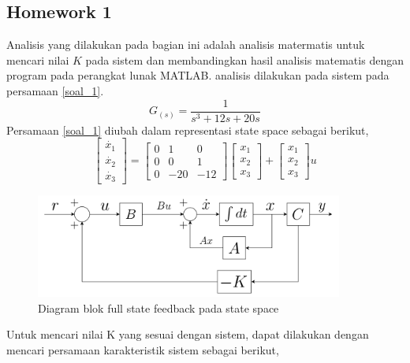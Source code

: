 \documentclass[../main.tex]{subfiles}
\begin{document}
        \subsection{Homework 1}
            Analisis yang dilakukan pada bagian ini adalah analisis matermatis untuk mencari nilai $K$ pada sistem dan membandingkan hasil analisis matematis dengan program pada perangkat lunak MATLAB. analisis dilakukan pada sistem pada persamaan \eqref{soal_1}.
            \begin{equation}
                G_{(s)} = \frac{1}{s^3 + 12s + 20s}
                \label{soal_1}
            \end{equation}
            Persamaan \eqref{soal_1} diubah dalam representasi state space sebagai berikut,
            \begin{equation}
                \begin{bmatrix} \dot{x_1} \\ \dot{x_2} \\ \dot{x_3} \end{bmatrix} = \begin{bmatrix} 0 & 1 & 0 \\ 0 & 0 & 1 \\ 0 & -20 & -12 \end{bmatrix} \begin{bmatrix} x_1 \\ x_2 \\ x_3 \end{bmatrix} + \begin{bmatrix} x_1 \\ x_2 \\ x_3 \end{bmatrix} u
            \end{equation}
            \begin{figure}[H]
                \centering
                \includegraphics[width = 0.9\textwidth]{assets/image/homework_1.png}
                \caption{Diagram blok full state feedback pada state space}
                \label{gambar_1}
            \end{figure}
            Untuk mencari nilai K yang sesuai dengan sistem, dapat dilakukan dengan mencari persamaan karakteristik sistem sebagai berikut,
\end{document}
